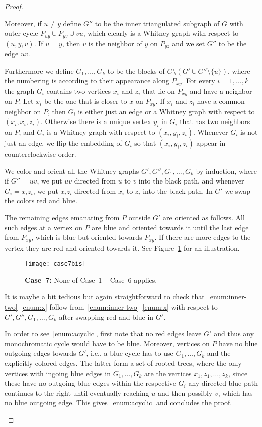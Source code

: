\documentclass[a4paper,10pt]{article}
\theoremstyle{plain}
\begin{document}
\begin{proof}
\begin{description}
   Moreover, if $u\neq y$ define $G''$ to be the inner triangulated subgraph of $G$ with outer cycle $P_{uy} \cup P_{yv} \cup vu$, which clearly is a Whitney graph with respect to $(u,y,v)$. If $u=y$, then $v$ is the neighbor of $y$ on $P_{yz}$ and we set $G''$ to be the edge $uv$.
 
   Furthermore we define $G_1,\ldots,G_k$ to be the blocks of $G \setminus (G'\cup G''\setminus\{u\})$, where the numbering is according to their appearance along $P_{xy}$. For every $i=1,\ldots,k$ the graph $G_i$ contains two vertices $x_i$ and $z_i$ that lie on $P_{xy}$ and have a neighbor on $P$. Let $x_i$ be the one that is closer to $x$ on $P_{xy}$. If $x_i$ and $z_i$ have a common neighbor on $P$, then $G_i$ is either just an edge or a Whitney graph with respect to $(x_i,x_i,z_i)$. Otherwise there is a unique vertex $y_i$ in $G_i$ that has two neighbors on $P$, and $G_i$ is a Whitney graph with respect to $(x_i,y_i,z_i)$. Whenever $G_i$ is not just an edge, we flip the embedding of $G_i$ so that $(x_i,y_i,z_i)$ appear in counterclockwise order. 

   We color and orient all the Whitney graphs $G', G'', G_1, \ldots, G_k$ by induction, where if $G''=uv$, we put $uv$ directed from $u$ to $v$ into the black path, and whenever $G_i = x_iz_i$, we put $x_iz_i$ directed from $x_i$ to $z_i$ into the black path. In $G'$ we swap the colors red and blue.

   The remaining edges emanating from $P$ outside $G'$ are oriented as follows. All such edges at a vertex on $P$ are blue and oriented towards it until the last edge from $P_{xy}$, which is blue but oriented towards $P_{xy}$. If there are more edges to the vertex they are red and oriented towards it.  See Figure~\ref{fig:case7} for an illustration.
 
   \begin{figure}[tb]
    \centering
    \texttt{[image: case7bis]}
    \caption{\textbf{Case~7:} None of Case~1 -- Case~6 applies.}
    \label{fig:case7}
   \end{figure}
 
   It is maybe a bit tedious but again straightforward to check that~\ref{enum:inner-two}--\ref{enum:x} follow from~\ref{enum:inner-two}--\ref{enum:x} with respect to $G', G'', G_1, \ldots, G_k$ after swapping red and blue in $G'$.
 
   In order to see~\ref{enum:acyclic}, first note that no red edges leave $G'$ and thus any monochromatic cycle would have to be blue.
   Moreover, vertices on $P$ have no blue outgoing edges towards $G'$, i.e., a blue cycle has to use $G_1, \ldots, G_k$ and the explicitly colored edges. The latter form a set of rooted trees, where the only vertices with ingoing blue edges in $G_1, \ldots, G_k$ are the vertices $x_1, z_1, \ldots, z_k$, since these have no outgoing blue edges within the respective $G_i$ any directed blue path continues to the right until eventually reaching $u$ and then possibly $v$, which has no blue outgoing edge. This gives~\ref{enum:acyclic} and concludes the proof.\qedhere
 \end{description} 
\end{proof}
\end{document}
